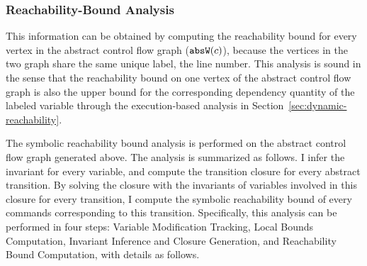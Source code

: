 \subsubsection{Reachability-Bound Analysis}
\label{sec:static-reachability}
This information can be obtained by computing the reachability bound for every vertex in the abstract control flow graph ($\mathtt{abs}{\mathtt{W}}(c)$), because
the vertices in the two graph share the same unique label, the line number. 
This analysis is sound in the sense that
the reachability bound on one vertex of the abstract control flow graph is also the upper bound for
the corresponding dependency quantity of the labeled variable through the execution-based analysis in Section~\ref{sec:dynamic-reachability}.

The symbolic reachability bound analysis is performed on the abstract control flow graph generated above.
The analysis is summarized as follows. 
I infer the invariant for every variable, and compute the transition closure for every abstract transition. By solving the closure
with the invariants of variables involved in this closure for every transition, I compute
the symbolic reachability bound of every commands corresponding to this transition. Specifically, this analysis can be performed in four steps:
 Variable Modification Tracking, Local Bounds Computation,
Invariant Inference and Closure Generation, and Reachability Bound Computation,
% 
with details as follows.
%
%
